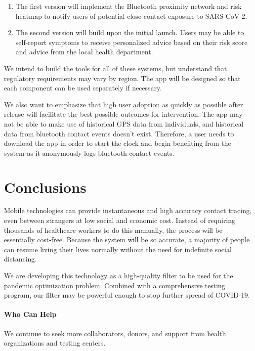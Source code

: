 \documentclass[11pt]{article}
\begin{document}
\begin{enumerate}
\item The first version will implement the Bluetooth proximity network and risk heatmap to notify users of potential close contact exposure to SARS-CoV-2.
\item The second version will build upon the initial launch. Users may be able to self-report symptoms to receive personalized advice based on their risk score and advice from the local health department.
\end{enumerate}


We intend to build the tools for all of these systems, but understand that regulatory requirements may vary by region. The app will be designed so that each component can be used separately if necessary.

We also want to emphasize that high user adoption as quickly as possible after release will facilitate the best possible outcomes for intervention. The app may not be able to make use of historical GPS data from individuals, and historical data from bluetooth contact events doesn’t exist. Therefore, a user needs to download the app in order to start the clock and begin benefiting from the system as it anonymously logs bluetooth contact events.


\section{Conclusions}

Mobile technologies can provide instantaneous and high accuracy contact tracing, even between strangers at low social and economic cost. Instead of requiring thousands of healthcare workers to do this manually, the process will be essentially cost-free. Because the system will be so accurate, a majority of people can resume living their lives normally without the need for indefinite social distancing.

We are developing this technology as a high-quality filter to be used for the pandemic optimization problem. Combined with a comprehensive testing program, our filter may be powerful enough to stop further spread of COVID-19. 

\paragraph{Who Can Help} We continue to seek more collaborators, donors, and support from health organizations and testing centers.
\end{document}
